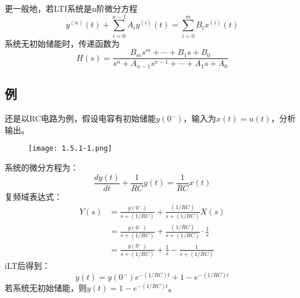 更一般地，若LTI系统是n阶微分方程
\[
y^{\left( n \right)}\left( t \right) +\sum_{i=0}^{n-1}{A_iy^{\left( i \right)}\left( t \right)}=\sum_{i=0}^m{B_ix^{\left( i \right)}\left( t \right)}
\]
系统无初始储能时，传递函数为
\[
H\left( s \right) =\frac{B_ms^m+\cdots +B_1s+B_0}{s^n+A_{n-1}s^{n-1}+\cdots +A_1s+A_0}
\]

\subsection{例}

\begin{example}
还是以RC电路为例，假设电容有初始储能$y\left( 0^- \right) $，输入为$x\left( t \right) =u\left( t \right) $，分析输出。
\begin{figure}[h]
\centering
\texttt{[image: 1.5.1-1.png]}
\end{figure}
\end{example}

系统的微分方程为：
\[
\frac{dy\left( t \right)}{dt}+\frac{1}{RC}y\left( t \right) =\frac{1}{RC}x\left( t \right)
\]
复频域表达式：
\begin{align*}
Y\left( s \right) &=\frac{y\left( 0^- \right)}{s+\left( 1/RC \right)}+\frac{\left( 1/RC \right)}{s+\left( 1/RC \right)}X\left( s \right) \\
&=\frac{y\left( 0^- \right)}{s+\left( 1/RC \right)}+\frac{\left( 1/RC \right)}{s+\left( 1/RC \right)}\cdot \frac{1}{s} \\
&=\frac{y\left( 0^- \right)}{s+\left( 1/RC \right)}+\frac{1}{s}-\frac{1}{s+\left( 1/RC \right)}
\end{align*}
iLT后得到：
\[
y\left( t \right) =y\left( 0^- \right) e^{-\left( 1/RC \right) t}+1-e^{-\left( 1/RC \right) t}
\]
若系统无初始储能，则$y\left( t \right) =1-e^{-\left( 1/RC \right) t}$。




